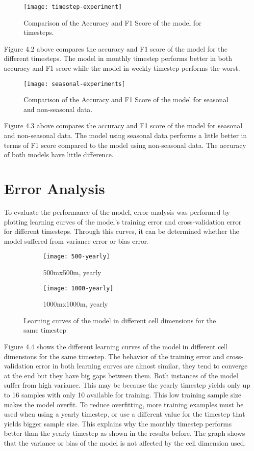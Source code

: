     \begin{figure}[H]
    \centering
    \texttt{[image: timestep-experiment]}
    \caption{Comparison of the Accuracy and F1 Score of the model for timesteps.}
    \end{figure}
    Figure 4.2 above compares the accuracy and F1 score of the model for the different timesteps. The model in monthly timestep performs better in both accuracy and F1 score while the model in weekly timestep performs the worst.
    
    \begin{figure}[H]
    \centering
    \texttt{[image: seasonal-experiments]}
    \caption{Comparison of the Accuracy and F1 Score of the model for seasonal and non-seasonal data.}
    \end{figure}
    Figure 4.3 above compares the accuracy and F1 score of the model for seasonal and non-seasonal data. The model using seasonal data performs a little better in terms of F1 score compared to the model using non-seasonal data. The accuracy of both models have little difference.

\section{Error Analysis}
    To evaluate the performance of the model, error analysis was performed by plotting learning curves of the model's training error and cross-validation error for different timesteps. Through this curves, it can be determined whether the model suffered from variance error or bias error.

    \begin{figure}[H]
    \centering
    \begin{subfigure}{.5\textwidth}
      \centering
      \texttt{[image: 500-yearly]}
      \caption{500mx500m, yearly}
    \end{subfigure}%
    \begin{subfigure}{.5\textwidth}
      \centering
      \texttt{[image: 1000-yearly]}
      \caption{1000mx1000m, yearly}
    \end{subfigure}
    \caption{Learning curves of the model in different cell dimensions for the same timestep}
    \end{figure}

    Figure 4.4 shows the different learning curves of the model in different cell dimensions for the same timestep. The behavior of the training error and cross-validation error in both learning curves are almost similar, they tend to converge at the end but they have big gaps between them. Both instances of the model suffer from high variance. This may be because the yearly timestep yields only up to 16 samples with only 10 available for training. This low training sample size makes the model overfit. To reduce overfitting, more training examples must be used when using a yearly timestep, or use a different value for the timestep that yields bigger sample size. This explains why the monthly timestep performs better than the yearly timestep as shown in the results before. The graph shows that the variance or bias of the model is not affected by the cell dimension used.

